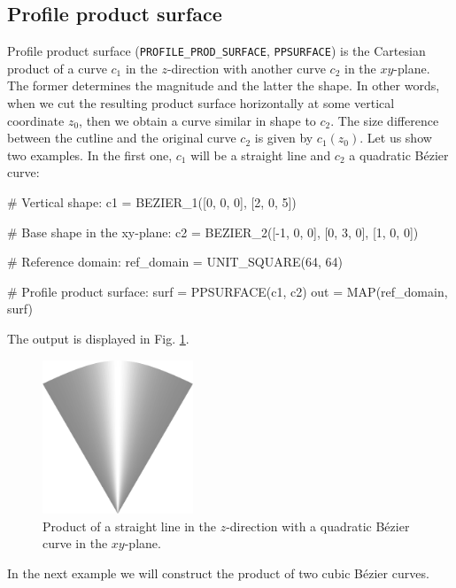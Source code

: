 \subsection{Profile product surface}

Profile product surface ({\tt PROFILE\_PROD\_SURFACE}, {\tt PPSURFACE}) is the 
Cartesian product of a curve $c_1$ in the $z$-direction with another curve 
$c_2$ in the $xy$-plane. The former determines the magnitude and the latter the shape.
In other words, when we cut the resulting product surface horizontally at some 
vertical coordinate $z_0$, then we obtain a curve similar in shape to $c_2$. The 
size difference between the cutline and the original curve $c_2$ is given by 
$c_1(z_0)$. 
Let us show two examples. In the first one, $c_1$ will be a straight 
line and $c_2$ a quadratic B\'ezier curve:

\begin{bluecode}
# Vertical shape:
c1 = BEZIER_1([0, 0, 0], [2, 0, 5])

# Base shape in the xy-plane:
c2 = BEZIER_2([-1, 0, 0], [0, 3, 0], [1, 0, 0])

# Reference domain:
ref_domain = UNIT_SQUARE(64, 64)

# Profile product surface: 
surf = PPSURFACE(c1, c2)
out = MAP(ref_domain, surf)
\end{bluecode}
The output is displayed in Fig. \ref{fig:curves-13b}.\\

\begin{figure}[!ht]
\begin{center}
\includegraphics[width=0.4\textwidth]{img/curves-13b.png}
\end{center}
\vspace{-4mm}
\caption{Product of a straight line in the $z$-direction with a quadratic B\'ezier 
         curve in the $xy$-plane.}
\label{fig:curves-13b}
\end{figure}
\noindent
In the next example we will construct the product of two cubic 
B\'ezier curves.

